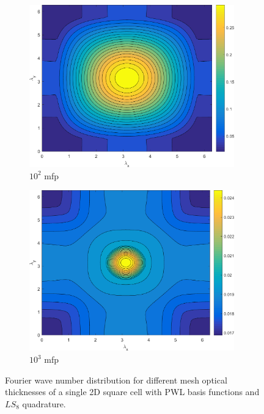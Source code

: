 \begin{figure}
{\begin{subfigure}[b]{0.485\textwidth}
		\centering
		\includegraphics[width=0.975\textwidth]{figures/sec_DSA/SI_MIP_C=4_UPWLD1_LS8_x=100_dydx=1_contour.png}
		\caption{$10^{2}$ mfp}
	\end{subfigure}
	\hfill
	\begin{subfigure}[b]{0.485\textwidth}
		\centering
		\includegraphics[width=0.975\textwidth]{figures/sec_DSA/SI_MIP_C=4_UPWLD1_LS8_x=1000_dydx=1_contour.png}
		\caption{$10^{3}$ mfp}
	\end{subfigure}
	}
\caption{Fourier wave number distribution for different mesh optical thicknesses of a single 2D square cell with PWL basis functions and $LS_{8}$ quadrature.}
\label{fig::2D_homo_dsa_wave_LS8}
\end{figure}

